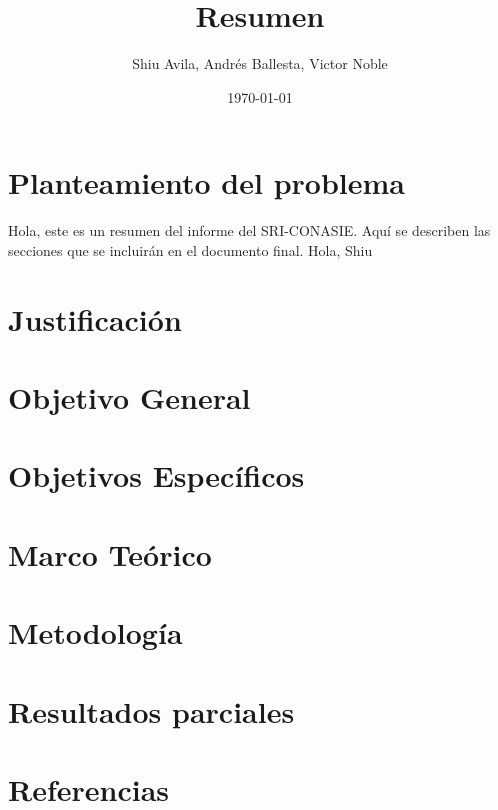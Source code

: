 \documentclass[12pt,a4paper]{article}
\title{Resumen}
\author{Shiu Avila, Andrés Ballesta, Victor Noble}
\date{\today}
\begin{document}
\maketitle

\section{Planteamiento del problema}

Hola, este es un resumen del informe del SRI-CONASIE. Aquí se describen las secciones que se incluirán en el documento final.
Hola, Shiu

\section{Justificación}
\section{Objetivo General}
\section{Objetivos Específicos}
\section{Marco Teórico}
\section{Metodología}
\section{Resultados parciales}
\section{Referencias}
\end{document}

